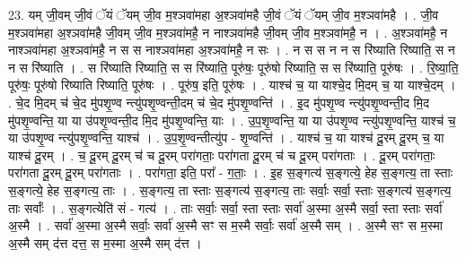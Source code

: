 \documentclass[17pt]{extarticle}
\begin{document}
23. यम् जी॒वम् जी॒वं ॅयं ॅयम् जी॒व म॒श्ञवा॑महा अ॒श्ञवा॑महै जी॒वं ॅयं ॅयम् जी॒व म॒श्ञवा॑महै । . जी॒व म॒श्ञवा॑महा अ॒श्ञवा॑महै जी॒वम् जी॒व म॒श्ञवा॑महै॒ न नाश्ञवा॑महै जी॒वम् जी॒व म॒श्ञवा॑महै॒ न । . अ॒श्ञवा॑महै॒ न नाश्ञवा॑महा अ॒श्ञवा॑महै॒ न स स नाश्ञवा॑महा अ॒श्ञवा॑महै॒ न सः । . न स स न न स रि॑ष्याति रिष्याति॒ स न न स रि॑ष्याति । . स रि॑ष्याति रिष्याति॒ स स रि॑ष्याति॒ पूरु॑षः॒ पूरु॑षो रिष्याति॒ स स रि॑ष्याति॒ पूरु॑षः । . रि॒ष्या॒ति॒ पूरु॑षः॒ पूरु॑षो रिष्याति रिष्याति॒ पूरु॑षः । . पूरु॑ष॒ इति॒ पूरु॑षः । . याश्च॑ च॒ या याश्चे॒द मि॒दम् च॒ या याश्चे॒दम् । . चे॒द मि॒दम् च॑ चे॒द मु॑पशृ॒ण्व न्त्यु॑पशृ॒ण्वन्ती॒दम् च॑ चे॒द मु॑पशृ॒ण्वन्ति॑ । . इ॒द मु॑पशृ॒ण्व न्त्यु॑पशृ॒ण्वन्ती॒द मि॒द मु॑पशृ॒ण्वन्ति॒ या या उ॑पशृ॒ण्वन्ती॒द मि॒द मु॑पशृ॒ण्वन्ति॒ याः । . उ॒प॒शृ॒ण्वन्ति॒ या या उ॑पशृ॒ण्व न्त्यु॑पशृ॒ण्वन्ति॒ याश्च॑ च॒ या उ॑पशृ॒ण्व न्त्यु॑पशृ॒ण्वन्ति॒ याश्च॑ । . उ॒प॒शृ॒ण्वन्तीत्यु॑प - शृ॒ण्वन्ति॑ । . याश्च॑ च॒ या याश्च॑ दू॒रम् दू॒रम् च॒ या याश्च॑ दू॒रम् । . च॒ दू॒रम् दू॒रम् च॑ च दू॒रम् परा॑गताः॒ परा॑गता दू॒रम् च॑ च दू॒रम् परा॑गताः । . दू॒रम् परा॑गताः॒ परा॑गता दू॒रम् दू॒रम् परा॑गताः । . परा॑गता॒ इति॒ परा᳚ - ग॒ताः॒ । . इ॒ह स॒ङ्गत्य॑ स॒ङ्गत्ये॒ हेह स॒ङ्गत्य॒ ता स्ताः स॒ङ्गत्ये॒ हेह स॒ङ्गत्य॒ ताः । . स॒ङ्गत्य॒ ता स्ताः स॒ङ्गत्य॑ स॒ङ्गत्य॒ ताः सर्वाः॒ सर्वा॒ स्ताः स॒ङ्गत्य॑ स॒ङ्गत्य॒ ताः सर्वाः᳚ । . स॒ङ्गत्येति॑ सं - गत्य॑ । . ताः सर्वाः॒ सर्वा॒ स्ता स्ताः सर्वा॑ अ॒स्मा अ॒स्मै सर्वा॒ स्ता स्ताः सर्वा॑ अ॒स्मै । . सर्वा॑ अ॒स्मा अ॒स्मै सर्वाः॒ सर्वा॑ अ॒स्मै सꣳ स म॒स्मै सर्वाः॒ सर्वा॑ अ॒स्मै सम् । . अ॒स्मै सꣳ स म॒स्मा अ॒स्मै सम् द॑त्त दत्त॒ स म॒स्मा अ॒स्मै सम् द॑त्त । \newline
\end{document}
